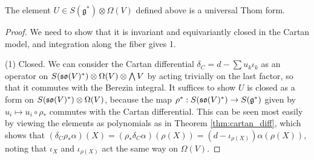\begin{thm} \label{thm:uinversal_Thom}
	The element $U \in S(\mathfrak{g}^*) \otimes \Omega(V)$ defined above  
	is a universal Thom form.
\end{thm}
\begin{proof} %
We need to show that it is invariant and
equivariantly closed in the Cartan model, and integration along the
fiber gives 1. 


(1) Closed. 
We can consider the Cartan
differential $\delta_C = d - \sum u_k\iota_k$ as an operator on 
$S(\operatorname{\mathfrak{so}}(V)^*)\otimes\Omega(V)\otimes\bigwedge V$ by acting trivially on
the last factor, so that it commutes with the Berezin integral. 
It suffices to show $U$ is closed as a form on  $S(\operatorname{\mathfrak{so}}(V)^*)\otimes \Omega(V)$,
because the map  $\rho^* : S(\operatorname{\mathfrak{so}}(V)^*)\to S(\operatorname{\mathfrak{g}}^*)$ given by  $u_i\mapsto
u_i\circ \rho_*$ commutes with the Cartan differential. This can be seen most
easily by viewing the elements as polynomials as in Theorem
\ref{thm:cartan_diff}, which shows that  $(\delta_C \rho_* \alpha)(X) 
= (\rho_*\delta_C \alpha)(\rho(X)) = (d-\iota_{\rho(X)})\alpha(\rho(X))$, noting
that $\iota_X$ and  $\iota_{\rho(X)}$ act the same way on $\Omega(V)$.


\end{proof}
